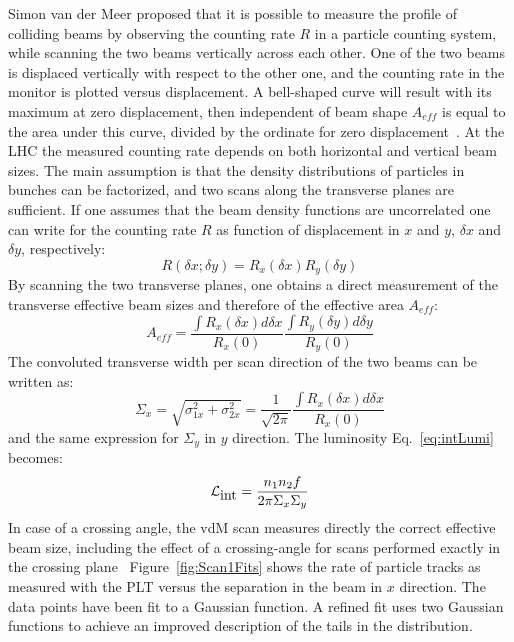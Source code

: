 Simon van der Meer proposed that it is possible to measure the profile of colliding beams
by observing the counting rate $R$ in a particle counting system, while scanning the two
beams vertically across each other. One of the two beams is displaced vertically with respect
to the other one, and the counting rate in the monitor is plotted versus displacement.
A bell-shaped curve will result with its maximum at zero displacement, then independent  of beam shape $A_{eff}$ is equal to the area under this curve,
divided by the ordinate for zero displacement~\cite{vanderMeer:296752}.
%
At the LHC the measured counting rate
depends on both horizontal and vertical beam sizes. The main assumption is that the
density distributions of particles in bunches can be factorized, and two scans along
the transverse planes are sufficient. If one assumes that the beam density functions
are uncorrelated one can write for the counting rate $R$ as function of displacement
in $x$ and $y$, $\delta x$ and $\delta y$, respectively:
\begin{equation}
R(\delta x;\delta y) = R_x(\delta x) R_y(\delta y)
\end{equation}
By scanning the two transverse planes, one obtains a direct measurement of the transverse
effective beam sizes and therefore of the effective area $A_{eff}$:
\begin{equation}
A_{eff} = \frac{\int R_x(\delta x) d\delta x}{R_x(0)} \frac{\int R_y(\delta y) d\delta y}{R_y(0)}
\end{equation}
The convoluted transverse width per scan direction of the two beams can be written as:
\begin{equation}
\Sigma_x = \sqrt{\sigma_{1x}^2+\sigma_{2x}^2} = \frac{1}{\sqrt{2\pi}}\frac{\int R_x(\delta x) d\delta x}{R_x(0)}
\end{equation}
and the same expression for $\Sigma_y$ in $y$ direction. The luminosity Eq.~\ref{eq:intLumi} becomes:
\begin{equation}
{\cal L}_{\mbox{int}} = \frac{n_1 n_2 f}{2\pi \Sigma_x \Sigma_y}
\end{equation}
In case of a crossing angle, the vdM scan measures directly the correct effective
beam size, including the effect of a crossing-angle for scans performed exactly in the
crossing plane~\cite{White:1308187}
%
Figure~\ref{fig:Scan1Fits} shows the rate of particle tracks as measured with the PLT versus
the separation in the beam in $x$ direction. The data points have been fit to a Gaussian
function. A refined fit uses two Gaussian functions to achieve an improved description
of the tails in the distribution.

